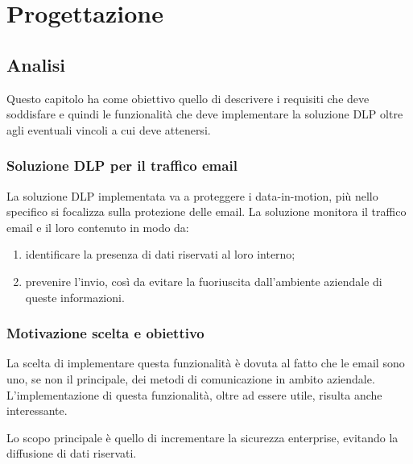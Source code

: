 \chapter{Progettazione}

\section{Analisi}
  Questo capitolo ha come obiettivo quello di descrivere i requisiti che deve soddisfare e quindi
  le funzionalità che deve implementare la soluzione DLP oltre agli eventuali vincoli a cui deve attenersi.

  \subsection{Soluzione DLP per il traffico email}
  La soluzione DLP implementata va a proteggere i data-in-motion, più nello specifico
  si focalizza sulla protezione delle email. La soluzione monitora il traffico email e
  il loro contenuto in modo da:

  \begin{enumerate}
      \item {identificare la presenza di dati riservati al loro interno;}
      \item {prevenire l'invio, così da evitare la fuoriuscita dall’ambiente aziendale di queste informazioni.}
  \end{enumerate}

  \subsection{Motivazione scelta e obiettivo}
  La scelta di implementare questa funzionalità è dovuta al fatto che le email sono uno, 
  se non il principale, dei metodi di comunicazione in ambito aziendale.
  L’implementazione di questa funzionalità, oltre ad essere utile, risulta anche interessante.

  Lo scopo principale è quello di incrementare la sicurezza enterprise,  
  evitando la diffusione di dati riservati.

  \pagebreak
